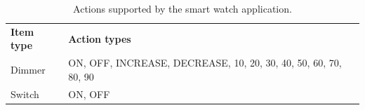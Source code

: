 \begin{table}[]
\centering
\caption{Actions supported by the smart watch application.}
\label{tbl:design:communication-with-openhab:supported-types}
\begin{tabular}{p{2cm}p{11cm}}
\textbf{Item type}      & \textbf{Action types}                      \\ 
Dimmer                  & ON, OFF, INCREASE, DECREASE, 10, 20, 30, 40, 50, 60, 70, 80, 90           \\
Switch                  & ON, OFF                                     
\end{tabular}
\end{table}

